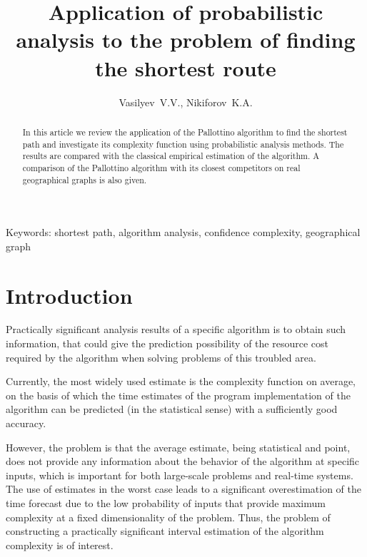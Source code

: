 \documentclass[a4paper]{article}
\begin{document}
\fontsize{14pt}{18pt}\selectfont


\author{Vasilyev~V.\:V., Nikiforov~K.\:A.}
\title{Application of probabilistic analysis to the problem of finding the shortest route}

\renewcommand{\thefootnote}{ }
{}


\maketitle

\begin{abstract}
	In this article we review the application of the Pallottino algorithm to find the shortest path and investigate its complexity function using probabilistic analysis methods. The results are compared with the classical empirical estimation of the algorithm. A comparison of the Pallottino algorithm with its closest competitors on real geographical graphs is also given.
\end{abstract}

Keywords: shortest path, algorithm analysis, confidence complexity, geographical graph

\newpage

\section{Introduction} \label{sec:introduction}

Practically significant analysis results of a specific algorithm is to obtain such information, that could give the prediction possibility of the resource cost required by the algorithm when solving problems of this troubled area.

Currently, the most widely used estimate is the complexity function on average, on the basis of which the time estimates of the program implementation of the algorithm can be predicted (in the statistical sense) with a sufficiently good accuracy.

However, the problem is that the average estimate, being statistical and point, does not provide any information about the behavior of the algorithm at specific inputs, which is important for both large-scale problems and real-time systems. The use of estimates in the worst case leads to a significant overestimation of the time forecast due to the low probability of inputs that provide maximum complexity at a fixed dimensionality of the problem. Thus, the problem of constructing a practically significant interval estimation of the algorithm complexity is of interest.
\end{document}
